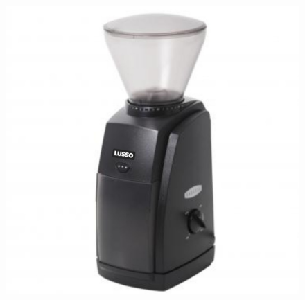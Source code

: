 \begin{figure}[h]
\begin{minipage}[c]{.6\textwidth}
    \end{minipage}
    \hfill
    \begin{minipage}[c]{.5\textwidth}
        \includegraphics[width=\linewidth]{grinder.jpg}%
    \end{minipage}
\end{figure}      



